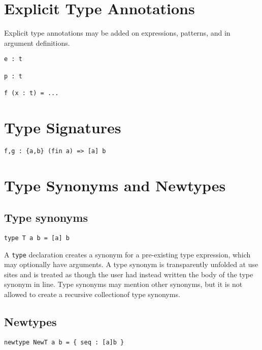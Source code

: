 \section{Explicit Type Annotations}\label{explicit-type-annotations}

Explicit type annotations may be added on expressions, patterns, and in
argument definitions.

\begin{verbatim}
e : t

p : t

f (x : t) = ...
\end{verbatim}

\section{Type Signatures}\label{type-signatures}

\begin{verbatim}
f,g : {a,b} (fin a) => [a] b
\end{verbatim}

\section{Type Synonyms and Newtypes}\label{type-synonyms-and-newtypes}

\subsection{Type synonyms}\label{type-synonyms}

\begin{verbatim}
type T a b = [a] b
\end{verbatim}

A \texttt{type} declaration creates a synonym for a pre-existing type
expression, which may optionally have arguments. A type synonym is
transparently unfolded at use sites and is treated as though the user
had instead written the body of the type synonym in line. Type synonyms
may mention other synonyms, but it is not allowed to create a recursive
collectionof type synonyms.

\subsection{Newtypes}\label{newtypes}

\begin{verbatim}
newtype NewT a b = { seq : [a]b }
\end{verbatim}

